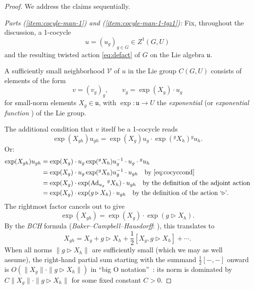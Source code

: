 \documentclass[pdftex]{sigma}
\numberwithin{equation}{section}
\newcommand\cV{{\mathcal V}}
\newcommand\fu{{\mathfrak u}}
\begin{document}
\begin{proof}
 We address the claims sequentially.

 \emph{Parts {\rm (\ref{item:cocyle-man-1})} and {\rm(\ref{item:cocyle-man-1-tgz1})}:} Fix, throughout the discussion, a 1-cocycle
 \begin{equation*}
 u=(u_g)_{g\in G}\in Z^1(G,U)
 \end{equation*}
 and the resulting twisted action \eqref{eq:defact} of $G$ on the Lie algebra $\fu$.

 A sufficiently small neighborhood $\cV$ of $u$ in the Lie group $C(G,U)$ consists of elements of the form
 \begin{equation*}
 v=(v_g)_g,\qquad v_g = \exp(X_g)\cdot u_g
 \end{equation*}
 for small-norm elements $X_g\in \fu$, with $\exp\colon\fu\to U$ the {\it exponential} (or {\it exponential function} \cite[discussion following Definition IV.1]{neeb-inf} ) of the Lie group.


 The additional condition that $v$ itself be a 1-cocycle reads
 \begin{equation*}
 \exp(X_{gh})u_{gh} = \exp(X_g)u_g \cdot \exp\left({}^gX_h\right){}^gu_h.
 \end{equation*}
 Or:
 \begin{align*}
 \exp(X_{gh})u_{gh} &= \exp(X_g)\cdot u_g\exp({}^gX_h)u_g^{-1}\cdot u_g\cdot{}^gu_h\\
 &= \exp(X_g)\cdot u_g\exp({}^gX_h)u_g^{-1}\cdot u_{gh}
 \quad\text{by \eqref{eq:cocyccond}}\\
 &=\exp(X_g)\cdot \exp(\operatorname{Ad}_{u_g}\,{}^gX_h)\cdot u_{gh}
 \quad\text{by the definition of the adjoint action}\\
 &=\exp(X_g)\cdot \exp(g\triangleright X_h)\cdot u_{gh}
 \quad\text{by the definition of the action `$\triangleright$'}.
 \end{align*}
 The rightmost factor cancels out to give
 \begin{equation*}
 \exp(X_{gh}) = \exp(X_g)\cdot \exp(g\triangleright X_h).
 \end{equation*}
 By the {\it BCH} formula ({\it Baker--Campbell--Hausdorff}: \cite[Definition IV.1.3 and Corollary IV.1.10]{neeb-lc}), this translates to
 \begin{equation*}
 X_{gh} = X_g + g\triangleright X_h + \frac 12\left[X_g,g\triangleright X_h\right] + \cdots.
 \end{equation*}
 When all norms $\|g\triangleright X_h\|$ are sufficiently small (which we may as well assume), the right-hand partial sum starting with the summand $\frac 12[-,-]$ onward is $O(\|X_g\|\cdot \|g\triangleright X_h\|)$ in ``big O notation''~\cite{bigo}: its norm is dominated by $C\|X_g\|\cdot \|g\triangleright X_h\|$ for some fixed constant $C>0$.


\end{proof}
\end{document}
